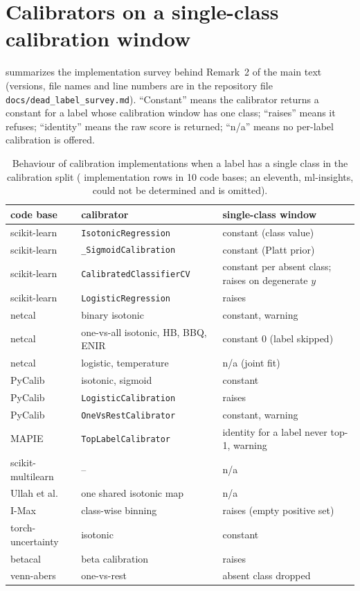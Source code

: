 \documentclass[sigconf,nonacm]{acmart}
\begin{document}
\section{Calibrators on a single-class calibration window}
\label{app:survey}
 summarizes the implementation survey behind Remark~2 of the main text (versions, file names and line numbers are in the repository file \texttt{docs/dead\_label\_survey.md}). ``Constant'' means the calibrator returns a constant for a label whose calibration window has one class; ``raises'' means it refuses; ``identity'' means the raw score is returned; ``n/a'' means no per-label calibration is offered.
\begin{table}[H]
\caption{Behaviour of calibration implementations when a label has a single class in the calibration split (\nnSurveyImpl{} implementation rows in 10 code bases; an eleventh, ml-insights, could not be determined and is omitted).}
\label{tab:survey}
\scriptsize
\setlength{\tabcolsep}{3pt}
\begin{tabular}{@{}lp{2.6cm}p{2.9cm}@{}}
\toprule
code base & calibrator & single-class window \\
\midrule
scikit-learn & \texttt{IsotonicRegression} & constant (class value) \\
scikit-learn & \texttt{\_SigmoidCalibration} & constant (Platt prior) \\
scikit-learn & \texttt{CalibratedClassifierCV} & constant per absent class; raises on degenerate $y$ \\
scikit-learn & \texttt{LogisticRegression} & raises \\
netcal & binary isotonic & constant, warning \\
netcal & one-vs-all isotonic, HB, BBQ, ENIR & constant $0$ (label skipped) \\
netcal & logistic, temperature & n/a (joint fit) \\
PyCalib & isotonic, sigmoid & constant \\
PyCalib & \texttt{LogisticCalibration} & raises \\
PyCalib & \texttt{OneVsRestCalibrator} & constant, warning \\
MAPIE & \texttt{TopLabelCalibrator} & identity for a label never top-1, warning \\
scikit-multilearn & -- & n/a \\
Ullah et al.~\cite{Ullah2025XMLCCalib} & one shared isotonic map & n/a \\
I-Max~\cite{Patel2021IMax} & class-wise binning & raises (empty positive set) \\
torch-uncertainty & isotonic & constant \\
betacal & beta calibration & raises \\
venn-abers & one-vs-rest & absent class dropped \\
\bottomrule
\end{tabular}
\end{table}
\end{document}
